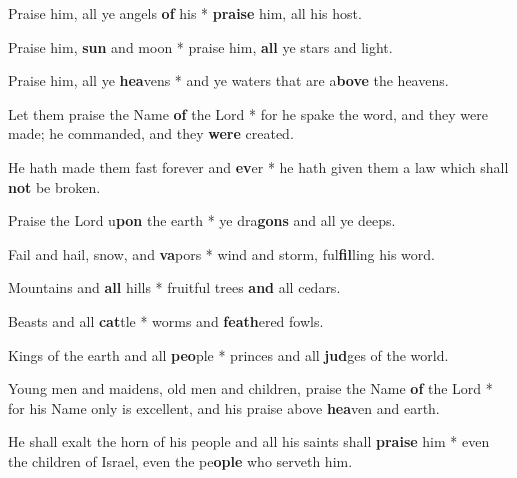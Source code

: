 \begin{multicols}{2}
	Praise him, all ye angels \textbf{of} his * \textbf{praise} him, all his host.
	
	Praise him, \textbf{sun} and moon * praise him, \textbf{all} ye stars and light.
	
	Praise him, all ye \textbf{hea}vens * and ye waters that are a\textbf{bove} the heavens.
	
	Let them praise the Name \textbf{of} the Lord * for he spake the word, and they were made; he commanded, and they \textbf{were} created.
	
	He hath made them fast forever and \textbf{ev}er * he hath given them a law which shall \textbf{not} be broken.
	
	Praise the Lord u\textbf{pon} the earth * ye dra\textbf{gons} and all ye deeps.
	
	Fail and hail, snow, and \textbf{va}pors * wind and storm, ful\textbf{fil}ling his word.
	
	Mountains and \textbf{all} hills * fruitful trees \textbf{and} all cedars.
	
	Beasts and all \textbf{cat}tle * worms and \textbf{feath}ered fowls.
	
	Kings of the earth and all \textbf{peo}ple * princes and all \textbf{jud}ges of the world.
	
	Young men and maidens, old men and children, praise the Name \textbf{of} the Lord * for his Name only is excellent, and his praise above \textbf{hea}ven and earth.
	
	He shall exalt the horn of his people and all his saints shall \textbf{praise} him * even the children of Israel, even the pe\textbf{ople} who serveth him.
\end{multicols}